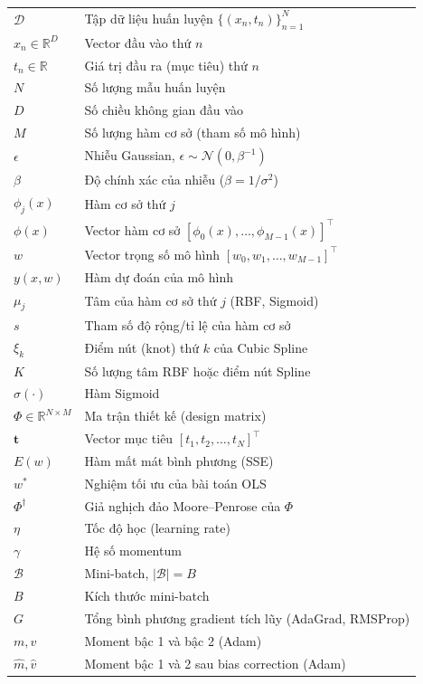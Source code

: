 \documentclass[oneside]{styles/hcmus-report}
\begin{document}
\begin{longtable}{p{} p{}}
$\mathcal{D}$ & Tập dữ liệu huấn luyện $\{(x_n, t_n)\}_{n=1}^{N}$ \\
$x_n \in \mathbb{R}^D$ & Vector đầu vào thứ $n$ \\
$t_n \in \mathbb{R}$ & Giá trị đầu ra (mục tiêu) thứ $n$ \\
$N$ & Số lượng mẫu huấn luyện \\
$D$ & Số chiều không gian đầu vào \\
$M$ & Số lượng hàm cơ sở (tham số mô hình) \\
$\epsilon$ & Nhiễu Gaussian, $\epsilon \sim \mathcal{N}(0, \beta^{-1})$ \\
$\beta$ & Độ chính xác của nhiễu ($\beta = 1/\sigma^2$) \\
$\phi_j(x)$ & Hàm cơ sở thứ $j$ \\
$\phi(x)$ & Vector hàm cơ sở $[\phi_0(x), \ldots, \phi_{M-1}(x)]^\top$ \\
$w$ & Vector trọng số mô hình $[w_0, w_1, \ldots, w_{M-1}]^\top$ \\
$y(x, w)$ & Hàm dự đoán của mô hình \\
$\mu_j$ & Tâm của hàm cơ sở thứ $j$ (RBF, Sigmoid) \\
$s$ & Tham số độ rộng/tỉ lệ của hàm cơ sở \\
$\xi_k$ & Điểm nút (knot) thứ $k$ của Cubic Spline \\
$K$ & Số lượng tâm RBF hoặc điểm nút Spline \\
$\sigma(\cdot)$ & Hàm Sigmoid \\
$\Phi \in \mathbb{R}^{N \times M}$ & Ma trận thiết kế (design matrix) \\
$\mathbf{t}$ & Vector mục tiêu $[t_1, t_2, \ldots, t_N]^\top$ \\
$E(w)$ & Hàm mất mát bình phương (SSE) \\
$w^*$ & Nghiệm tối ưu của bài toán OLS \\
$\Phi^\dagger$ & Giả nghịch đảo Moore--Penrose của $\Phi$ \\
$\eta$ & Tốc độ học (learning rate) \\
$\gamma$ & Hệ số momentum \\
$\mathcal{B}$ & Mini-batch, $|\mathcal{B}| = B$ \\
$B$ & Kích thước mini-batch \\
$G$ & Tổng bình phương gradient tích lũy (AdaGrad, RMSProp) \\
$m, v$ & Moment bậc 1 và bậc 2 (Adam) \\
$\hat{m}, \hat{v}$ & Moment bậc 1 và 2 sau bias correction (Adam) \\

\end{longtable}
\end{document}
